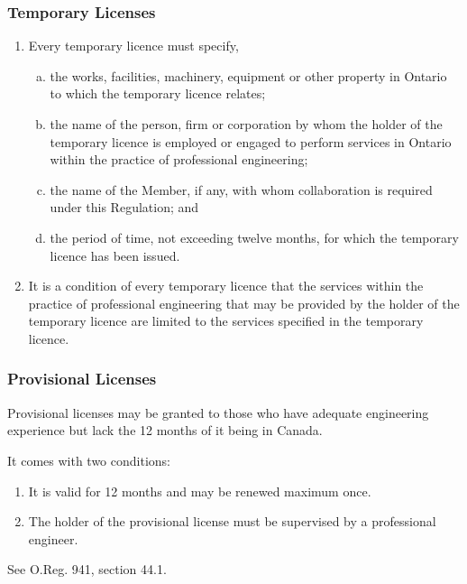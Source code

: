 \begin{frame}
\frametitle{Temporary Licenses}

\begin{enumerate}
	\item Every temporary licence must specify,
	\begin{enumerate}[(a)]
\item the works, facilities, machinery, equipment or other property in Ontario to which the temporary licence relates;
\item the name of the person, firm or corporation by whom the holder of the temporary licence is employed or engaged to perform services in Ontario within the practice of professional engineering;
\item the name of the Member, if any, with whom collaboration is required under this Regulation; and
\item the period of time, not exceeding twelve months, for which the temporary licence has been issued.
\end{enumerate}
	\item It is a condition of every temporary licence that the services within the practice of professional engineering that may be provided by the holder of the temporary licence are limited to the services specified in the temporary licence. 
\end{enumerate}

\end{frame}



\begin{frame}
\frametitle{Provisional Licenses}

Provisional licenses may be granted to those who have adequate engineering experience but lack the 12 months of it being in Canada. 

It comes with two conditions:

\begin{enumerate}
	\item It is valid for 12 months and may be renewed maximum once.
	\item The holder of the provisional license must be supervised by a professional engineer.
\end{enumerate}

See O.Reg. 941, section 44.1.

\end{frame}



